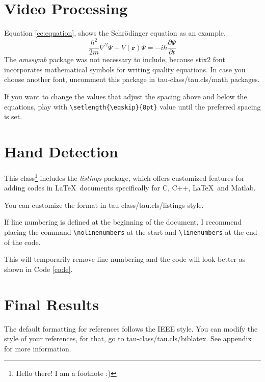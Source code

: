 \documentclass[9pt,a4paper,twoside]{tau-class/tau}
\begin{document}
\section{Video Processing}

    Equation \ref{ec:equation}, shows the Schrödinger equation as an example. 
	\begin{equation} \label{ec:equation}
		\frac{\hbar^2}{2m}\nabla^2\Psi + V(\mathbf{r})\Psi = -i\hbar \frac{\partial\Psi}{\partial t}
	\end{equation} 
    The \textit{amssymb} package was not necessary to include, because stix2 font incorporates mathematical symbols for writing quality equations. In case you choose another font, uncomment this package in tau-class/tau.cls/math packages.
	
    If you want to change the values that adjust the spacing above and below the equations, play with \verb|\setlength{\eqskip}{8pt}| value until the preferred spacing is set.
	
\section{Hand Detection}
	
    This class\footnote{Hello there! I am a footnote :)} includes the \textit{listings} package, which offers customized features for adding codes in \LaTeX\ documents specifically for C, C++, \LaTeX\ and Matlab. 
	
    You can customize the format in tau-class/tau.cls/listings style.
	
        \nolinenumbers
            
	\linenumbers
	
    If line numbering is defined at the beginning of the document, I recommend placing the command \verb|\nolinenumbers| at the start and \verb|\linenumbers| at the end of the code. 
	
    This will temporarily remove line numbering and the code will look better as shown in Code \ref{code}.
	
\section{Final Results}

    The default formatting for references follows the IEEE style. You can modify the style of your references, for that, go to tau-class/tau.cls/biblatex. See appendix for more information.
	
\end{document}
